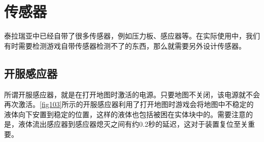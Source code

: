 \section{传感器}
泰拉瑞亚中已经自带了很多传感器，例如压力板、感应器等。在实际使用中，我们有时需要检测游戏自带传感器检测不了的东西，那么就需要另外设计传感器。

\subsection{开服感应器}
所谓开服感应器，就是在打开地图时激活的电源。只要地图不关闭，该电源就不会再次激活。\autoref{fig103}所示的开服感应器利用了打开地图时游戏会将地图中不稳定的液体向下安置到稳定的位置，这样的液体也包括被困在实体块中的。需要注意的是，液体流出感应器到感应器熄灭之间有约0.2秒的延迟，这对于装置复位至关重要。

